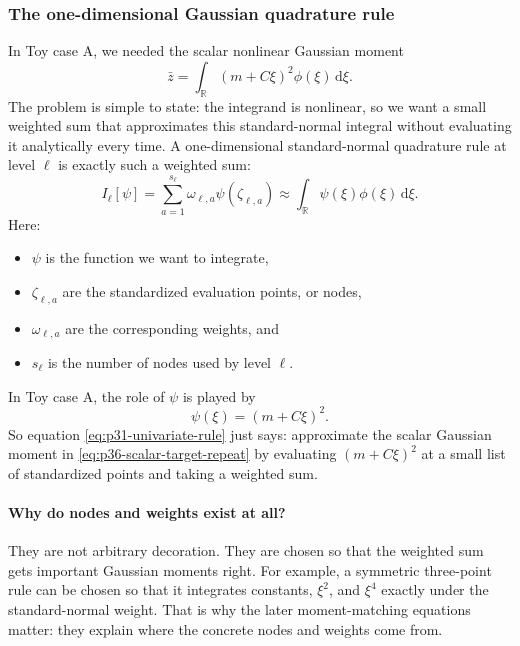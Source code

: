 \documentclass[11pt]{article}
\numberwithin{equation}{section}
\newcommand{\R}{\mathbb R}
\newcommand{\dd}{\,\mathrm d}
\begin{document}
\subsubsection{The one-dimensional Gaussian quadrature rule}

In Toy case A, we needed the scalar nonlinear Gaussian moment
\begin{equation}
  \bar z
  =
  \int_{\R}(m+C\xi)^2\phi(\xi)\dd\xi.
  \label{eq:p36-scalar-target-repeat}
\end{equation}
The problem is simple to state: the integrand is nonlinear, so we want a small
weighted sum that approximates this standard-normal integral without evaluating
it analytically every time.  A one-dimensional standard-normal quadrature rule at
level \(\ell\) is exactly such a weighted sum:
\begin{equation}
  I_\ell[\psi]
  =
  \sum_{a=1}^{s_\ell}\omega_{\ell,a}\psi(\zeta_{\ell,a})
  \approx
  \int_{\R}\psi(\xi)\phi(\xi)\dd \xi.
  \label{eq:p31-univariate-rule}
\end{equation}
Here:
\begin{itemize}[leftmargin=0.28in]
  \item \(\psi\) is the function we want to integrate,
  \item \(\zeta_{\ell,a}\) are the standardized evaluation points, or nodes,
  \item \(\omega_{\ell,a}\) are the corresponding weights, and
  \item \(s_\ell\) is the number of nodes used by level \(\ell\).
\end{itemize}
In Toy case A, the role of \(\psi\) is played by
\begin{equation}
  \psi(\xi)=(m+C\xi)^2.
  \label{eq:p35-scalar-psi}
\end{equation}
So equation \eqref{eq:p31-univariate-rule} just says: approximate the scalar
Gaussian moment in \eqref{eq:p36-scalar-target-repeat} by evaluating
\((m+C\xi)^2\) at a small list of standardized points and taking a weighted sum.

\paragraph{Why do nodes and weights exist at all?}
They are not arbitrary decoration.  They are chosen so that the weighted sum gets
important Gaussian moments right.  For example, a symmetric three-point rule can
be chosen so that it integrates constants, \(\xi^2\), and \(\xi^4\) exactly under
the standard-normal weight.  That is why the later moment-matching equations
matter: they explain where the concrete nodes and weights come from.
\end{document}

